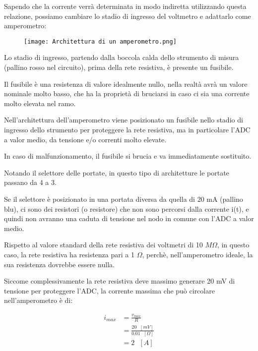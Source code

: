 Sapendo che la corrente verrà determinata in modo indiretta utilizzando questa relazione, 
possiamo cambiare lo stadio di ingresso del voltmetro e adattarlo come amperometro: 

\begin{figure}[h]
    \centering
    \texttt{[image: Architettura di un amperometro.png]}
\end{figure}

Lo stadio di ingresso, partendo dalla boccola calda dello strumento di misura (pallino rosso nel circuito), 
prima della rete resistiva, è presente un fusibile. \newline 

Il fusibile è una resistenza di valore idealmente nullo, nella realtà avrà un valore nominale molto basso, 
che ha la proprietà di bruciarsi in caso ci sia una corrente molto elevata nel ramo. \newline 

Nell'architettura dell'amperometro viene posizionato un fusibile nello stadio di ingresso dello strumento per proteggere la rete resistiva, ma in particolare l'ADC a valor medio, 
da tensione e/o correnti molto elevate. \newline 

In caso di malfunzionamento, il fusibile si brucia e va immediatamente sostituito. \newline 

Notando il selettore delle portate, in questo tipo di architetture le portate passano da 4 a 3. \newline 

Se il selettore è posizionato in una portata diversa da quella di 20 mA (pallino blu), 
ci sono dei resistori (o resistore) che non sono percorsi dalla corrente i(t), 
e quindi non avranno una caduta di tensione nel nodo in comune con l'ADC a valor medio. \newline 

Rispetto al valore standard della rete resistiva dei voltmetri di 10 $M \Omega$, 
in questo caso, la rete resistiva ha resistenza pari a 1 $\Omega$, perchè, nell'amperometro ideale, la sua resistenza dovrebbe essere nulla. \newline 

Siccome complessivamente la rete resistiva deve massimo generare 20 mV di tensione per proteggere l'ADC, 
la corrente massima che può circolare nell'amperometro è di: 

{
    \Large
    \begin{equation}
        \begin{split}
            i_{max} &= \frac{v_{max}}{R}
            \\
            &= \frac{20 \text{ }[mV]}{0.01 \text{ }[\Omega]}
            \\
            &= 
            2 \text{ } [A]
        \end{split}
    \end{equation}
}

